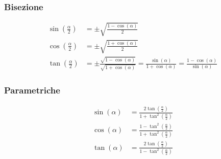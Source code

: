 \subsubsection*{Bisezione}
\begin{align}
    \sin(\frac{\alpha}{2}) & = \pm\sqrt{\frac{1-\cos(\alpha)}{2}}
    \label{eq:goniometria_formule_di_bisezione_seno}                                                                                                          \\
    \cos(\frac{\alpha}{2}) & = \pm\sqrt{\frac{1+\cos(\alpha)}{2}}
    \label{eq:goniometria_formule_di_bisezione_coseno}                                                                                                        \\
    \tan(\frac{\alpha}{2}) & = \pm\frac{\sqrt{1-\cos(\alpha)}}{\sqrt{1+\cos(\alpha)}}=\frac{\sin(\alpha)}{1+\cos(\alpha)}=\frac{1-\cos(\alpha)}{\sin(\alpha)}
    \label{eq:goniometria_formule_di_bisezione_tangente}
\end{align}


\subsubsection*{Parametriche}
\begin{align}
    \sin(\alpha) & = \frac{2\tan(\frac{\alpha}{2})}{1+\tan^2(\frac{\alpha}{2})}
    \label{eq:goniometria_formule_parametriche_seno}                               \\
    \cos(\alpha) & = \frac{1-\tan^2(\frac{\alpha}{2})}{1+\tan^2(\frac{\alpha}{2})}
    \label{eq:goniometria_formule_parametriche_coseno}                             \\
    \tan(\alpha) & = \frac{2\tan(\frac{\alpha}{2})}{1-\tan^2(\frac{\alpha}{2})}
    \label{eq:goniometria_formule_parametriche_tangente}
\end{align}

